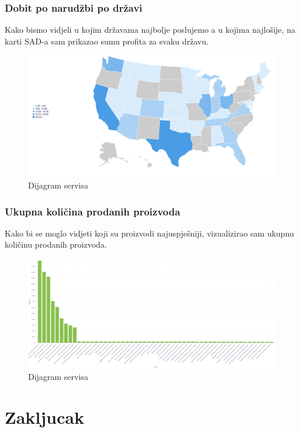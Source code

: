 \documentclass[12pt, oneside]{book}
\begin{document}
\subsection{Dobit po narudžbi po državi}
Kako bismo vidjeli u kojim državama najbolje poslujemo a u kojima najlošije, na karti SAD-a sam prikazao sumu profita za svaku državu. 

\begin{figure}[H]
\includegraphics[width=16cm]{images/Metabase-State.png}
\centering
\caption{Dijagram servisa}
\end{figure}

\subsection{Ukupna količina prodanih proizvoda}
Kako bi se moglo vidjeti koji su proizvodi najuspješniji, vizualizirao sam ukupnu količinu prodanih proizvoda. 

\begin{figure}[H]
\includegraphics[width=16cm]{images/Metabase-TotalItemsSold.png}
\centering
\caption{Dijagram servisa}
\end{figure}



\chapter{Zakljucak}
\end{document}
